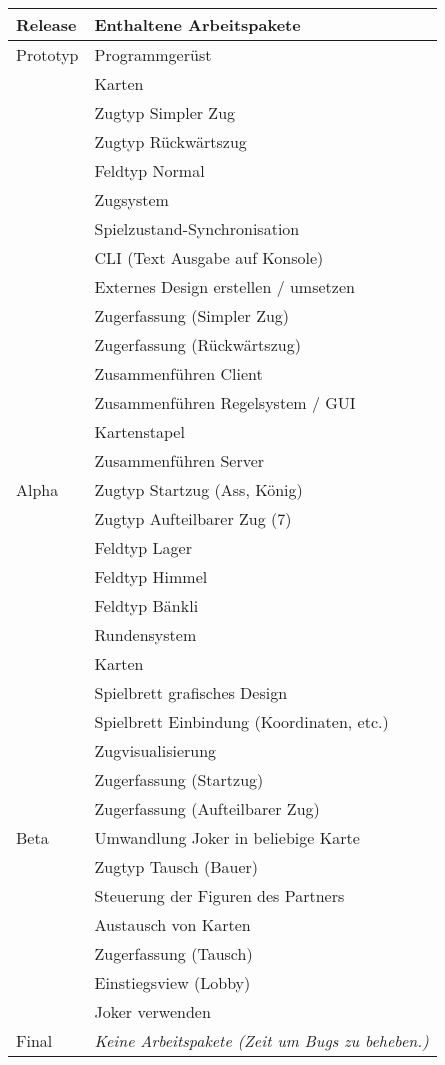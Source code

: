 \documentclass[a4paper,12pt,halfparskip,DIV14]{scrartcl}
\begin{document}
\begin{tabular}{ll}
\toprule
Release 	&  Enthaltene Arbeitspakete \\
\midrule
Prototyp	&	Programmgerüst \\
					& Karten \\
					& Zugtyp Simpler Zug \\
					& Zugtyp Rückwärtszug \\
 					& Feldtyp Normal \\
					& Zugsystem \\
					& Spielzustand-Synchronisation \\
					& CLI (Text Ausgabe auf Konsole) \\
					& Externes Design erstellen / umsetzen\\
					& Zugerfassung (Simpler Zug) \\
					& Zugerfassung (Rückwärtszug) \\
					& Zusammenführen Client \\
					& Zusammenführen Regelsystem / GUI \\
					& Kartenstapel \\
					& Zusammenführen Server\\
\midrule
Alpha			& Zugtyp Startzug (Ass, König) \\
					& Zugtyp Aufteilbarer Zug (7) \\
					& Feldtyp Lager \\
					& Feldtyp Himmel \\
					& Feldtyp Bänkli \\
					& Rundensystem \\
					& Karten \\
					& Spielbrett grafisches Design \\
					& Spielbrett Einbindung (Koordinaten, etc.) \\
					& Zugvisualisierung \\
					& Zugerfassung (Startzug) \\
					& Zugerfassung (Aufteilbarer Zug) \\
\midrule
Beta			& Umwandlung Joker in beliebige Karte \\
					& Zugtyp Tausch (Bauer) \\
					& Steuerung der Figuren des Partners \\
					& Austausch von Karten \\
					& Zugerfassung (Tausch) \\
					& Einstiegsview (Lobby) \\
					& Joker verwenden\\
\midrule
Final			& \emph{Keine Arbeitspakete (Zeit um Bugs zu beheben.)}\\
\bottomrule

\end{tabular}
\end{document}
